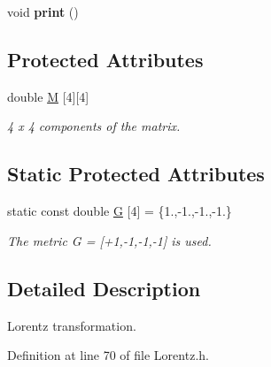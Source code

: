 \begin{DoxyCompactItemize}
\item 
\hypertarget{classLT_a6687d255d8543565e26ae9bc37b4a414}{void {\bfseries print} ()}\label{classLT_a6687d255d8543565e26ae9bc37b4a414}

\end{DoxyCompactItemize}
\subsection*{Protected Attributes}
\begin{DoxyCompactItemize}
\item 
\hypertarget{classLT_adfe83a60779798fcb358f2fb12d79cda}{double \hyperlink{classLT_adfe83a60779798fcb358f2fb12d79cda}{M} \mbox{[}4\mbox{]}\mbox{[}4\mbox{]}}\label{classLT_adfe83a60779798fcb358f2fb12d79cda}

\begin{DoxyCompactList}\small\item\em 4 x 4 components of the matrix. \end{DoxyCompactList}\end{DoxyCompactItemize}
\subsection*{Static Protected Attributes}
\begin{DoxyCompactItemize}
\item 
\hypertarget{classLT_a3ec591d3e26134d35eb127d0610c7866}{static const double \hyperlink{classLT_a3ec591d3e26134d35eb127d0610c7866}{G} \mbox{[}4\mbox{]} = \{1.,-\/1.,-\/1.,-\/1.\}}\label{classLT_a3ec591d3e26134d35eb127d0610c7866}

\begin{DoxyCompactList}\small\item\em The metric G = \mbox{[}+1,-\/1,-\/1,-\/1\mbox{]} is used. \end{DoxyCompactList}\end{DoxyCompactItemize}


\subsection{Detailed Description}
Lorentz transformation. 

Definition at line 70 of file Lorentz.\-h.



